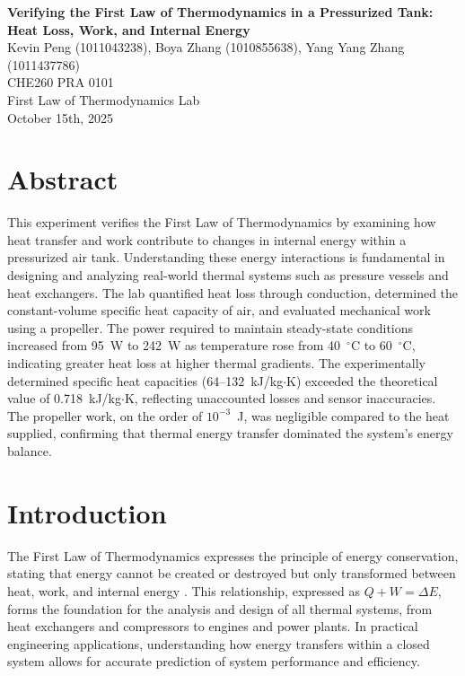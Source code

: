 \documentclass[12pt]{article}
\begin{document}
\begin{center}
\textbf{\Large Verifying the First Law of Thermodynamics in a Pressurized Tank: Heat Loss, Work, and Internal Energy} \\[0.5em]
Kevin Peng (1011043238), Boya Zhang (1010855638), Yang Yang Zhang (1011437786)\\[0.5em]
CHE260 PRA 0101 \\
First Law of Thermodynamics Lab \\
October 15th, 2025 \\
\end{center}

\section*{Abstract}
This experiment verifies the First Law of Thermodynamics by examining how heat transfer and work contribute to changes in internal energy within a pressurized air tank.
Understanding these energy interactions is fundamental in designing and analyzing real-world thermal systems such as pressure vessels and heat exchangers.
The lab quantified heat loss through conduction, determined the constant-volume specific heat capacity of air, and evaluated mechanical work using a propeller.
The power required to maintain steady-state conditions increased from 95~W to 242~W as temperature rose from 40~$^{\circ}$C to 60~$^{\circ}$C, indicating greater heat loss at higher thermal gradients.
The experimentally determined specific heat capacities (64--132~kJ/kg$\cdot$K) exceeded the theoretical value of 0.718~kJ/kg$\cdot$K, reflecting unaccounted losses and sensor inaccuracies.
The propeller work, on the order of $10^{-3}$~J, was negligible compared to the heat supplied, confirming that thermal energy transfer dominated the system’s energy balance.

\section*{Introduction}
The First Law of Thermodynamics expresses the principle of energy conservation, stating that energy cannot be created or destroyed but only transformed between heat, work, and internal energy \cite{che260_manual}.
This relationship, expressed as $Q + W = \Delta E$, forms the foundation for the analysis and design of all thermal systems, from heat exchangers and compressors to engines and power plants. In practical engineering applications, understanding how energy transfers within a closed system allows for accurate prediction of system performance and efficiency.
\end{document}
